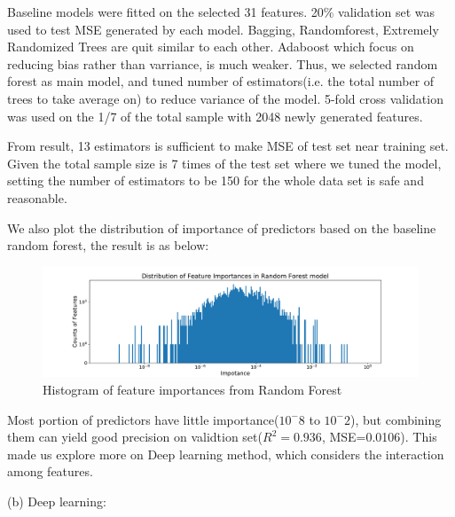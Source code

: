 \documentclass[11pt]{article}
\begin{document}
Baseline models were fitted on the selected 31 features. 20\% validation set was used to test MSE generated by each model. Bagging, Randomforest, Extremely Randomized Trees are quit similar to each other. Adaboost which focus on reducing bias rather than varriance, is much weaker. Thus, we selected random forest as main model, and tuned number of estimators(i.e. the total number of trees to take average on) to reduce variance of the model. 5-fold cross validation was used on the 1/7 of the total sample with 2048 newly generated features. 

From result, 13 estimators is sufficient to make MSE of test set near training set. Given the total sample size is 7 times of the test set where we tuned the model, setting the number of estimators to be 150 for the whole data set is safe and reasonable.

We also plot the distribution of importance of predictors based on the baseline random forest, the result is as below:

\begin{figure}[h]
\centering
\includegraphics[width=\textwidth]{his_feature_importance}
\caption{Histogram of feature importances from Random Forest}
\label{fig:his_feature_importance}
\end{figure}

Most portion of predictors have little importance($10^-8$ to $10^-2$), but combining them can yield good precision on validtion set($R^2 = 0.936$, MSE=0.0106). This made us explore more on Deep learning method, which considers the interaction among features.

(b) Deep learning: 

\end{document}

